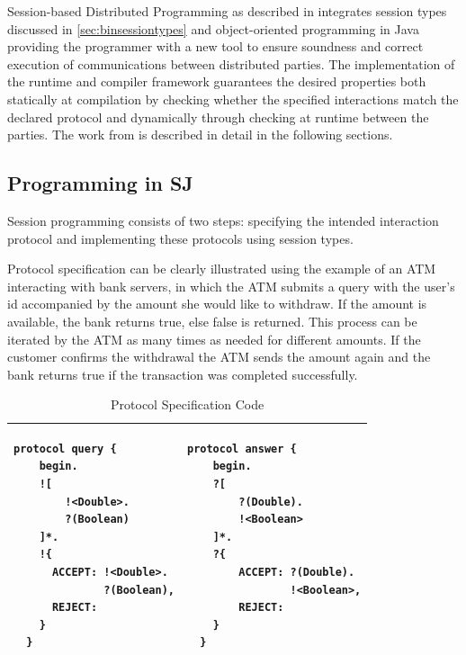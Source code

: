	
Session-based Distributed Programming as described in \cite{sessionbased_programming} integrates session types discussed in \autoref{sec:binsessiontypes} and object-oriented programming in Java providing the programmer with a new tool to ensure soundness and correct execution of communications between distributed parties. The implementation of the runtime and compiler framework guarantees the desired properties both statically at compilation by checking whether the specified interactions match the declared protocol and dynamically through checking at runtime between the parties. The work from \cite{sessionbased_programming} is described in detail in the following sections.

\subsection{Programming in SJ}
\label{subsec:sjprogram}

Session programming consists of two steps: specifying the intended interaction protocol and implementing these protocols using session types.

Protocol specification can be clearly illustrated using the example of an ATM interacting with bank servers, in which the ATM submits a query with the user's id accompanied by the amount she would like to withdraw. If the amount is available, the bank returns true, else false is returned. This process can be iterated by the ATM as many times as needed for different amounts. If the customer confirms the withdrawal the ATM sends the amount again and the bank returns true if the transaction was completed successfully.

\begin{table}[H]
\center
\caption{Protocol Specification Code}
\begin{tabular}{|l|l|}
\hline

  \begin{lstlisting}[basicstyle=\LISTINGSTYLE]
  protocol query {
    begin.
    ![
        !<Double>.
        ?(Boolean)
    ]*.
    !{
      ACCEPT: !<Double>.
              ?(Boolean),
      REJECT:
    }
  }
  \end{lstlisting}
  &
  \begin{lstlisting}[basicstyle=\LISTINGSTYLE]
  protocol answer {
    begin.
    ?[
        ?(Double).
        !<Boolean>
    ]*.
    ?{
        ACCEPT: ?(Double).
                !<Boolean>,
        REJECT:
    }
  }
  \end{lstlisting}\\
  \hline
  
\end{tabular}
\label{CODEprotocol}
\end{table}

